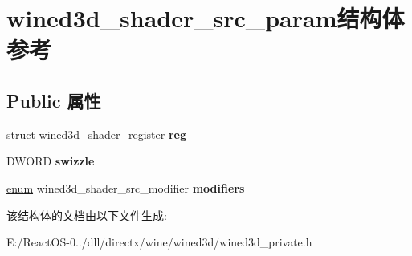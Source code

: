 \hypertarget{structwined3d__shader__src__param}{}\section{wined3d\+\_\+shader\+\_\+src\+\_\+param结构体 参考}
\label{structwined3d__shader__src__param}
\subsection*{Public 属性}
\begin{DoxyCompactItemize}
\item 
\mbox{\label{structwined3d__shader__src__param_a7cb62a6aa7be83a5d13dac5182949c76}} 
\hyperlink{interfacestruct}{struct} \hyperlink{structwined3d__shader__register}{wined3d\+\_\+shader\+\_\+register} {\bfseries reg}
\item 
\mbox{\label{structwined3d__shader__src__param_a2166e7135e78667dcfc37ddce55af0a2}} 
D\+W\+O\+RD {\bfseries swizzle}
\item 
\mbox{\label{structwined3d__shader__src__param_a6dad1ea32cb381288b3dc493e42e39be}} 
\hyperlink{interfaceenum}{enum} wined3d\+\_\+shader\+\_\+src\+\_\+modifier {\bfseries modifiers}
\end{DoxyCompactItemize}


该结构体的文档由以下文件生成\+:\begin{DoxyCompactItemize}
\item 
E\+:/\+React\+O\+S-\/0../dll/directx/wine/wined3d/wined3d\+\_\+private.\+h\end{DoxyCompactItemize}
